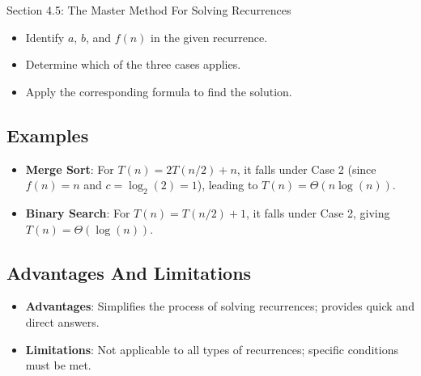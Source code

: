 \begin{notes}{Section 4.5: The Master Method For Solving Recurrences}
    \begin{itemize}
        \item Identify $a$, $b$, and $f(n)$ in the given recurrence.
        \item Determine which of the three cases applies.
        \item Apply the corresponding formula to find the solution.
    \end{itemize}

    \subsection*{Examples}

    \begin{itemize}
        \item \textbf{Merge Sort}: For $T(n) = 2T(n / 2) + n$, it falls under Case 2 (since $f(n) = n$ and $c = \log_{2}{(2)} = 1$), leading to $T(n) = \Theta(n \log{(n)})$.
        \item \textbf{Binary Search}: For $T(n) = T(n / 2) + 1$, it falls under Case 2, giving $T(n) = \Theta(\log{(n)})$.
    \end{itemize}

    \subsection*{Advantages And Limitations}

    \begin{itemize}
        \item \textbf{Advantages}: Simplifies the process of solving recurrences; provides quick and direct answers.
        \item \textbf{Limitations}: Not applicable to all types of recurrences; specific conditions must be met.
    \end{itemize}
\end{notes}
